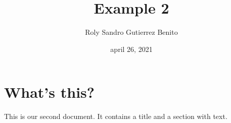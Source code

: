 \documentclass[a4paper, 11pt]{article}
\begin{document}
\title{Example 2}
\author{Roly Sandro Gutierrez Benito}
\date{ april 26, 2021}
\section{What's this?}
This is our second document. It contains a title and a section with text.
\end{document}
